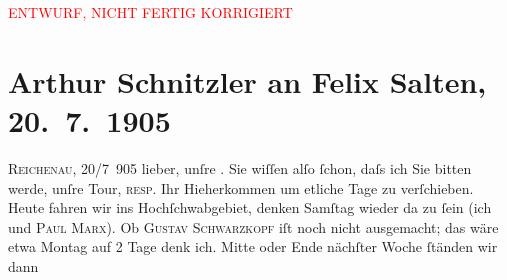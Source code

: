 
\begin{center}
            \textcolor{red}{ENTWURF, NICHT FERTIG KORRIGIERT}
                      \end{center}
            
         
         \renewcommand{\erwaehntePersonen}{Personen: Hermann Bahr, Paul Marx, Felix Salten, Paul Salten, Gustav Schwarzkopf}
         \renewcommand{\erwaehnteOrte}{Orte: Eisenerz, Hochschwab, Hotel Hochschwab, Kurhaus Rudolfsbad, Mariazell, Reichenau an der Rax, Weichselboden, Wien, Wildalpen}
         \renewcommand{\erwaehnteWerke}{Werke: Die Andere}
               \section[Arthur Schnitzler an Felix Salten, 20. 7. 1905]{ Arthur Schnitzler an Felix Salten, 20. 7. 1905}\nopagebreak{}\rehead{ }\begin{ledgroupsized}[t]{13cm}\normalsize\beginnumbering \toendnotes[C]{\smallbreak\pagebreak[2]} 
\toendnotes[C]{\smallbreak}\pstart
           \raggedleft{}{\pb}\textsc{Reichenau}, 20/7 905\pend
           \pstart
           lieber, unſre \label{K_L03000-1v}\label{K_L03000-1h}. Sie wiſſen alſo ſchon,
               daſs ich Sie bitten werde, unſre Tour, \textsc{resp.} Ihr
               Hieherkommen um etliche Tage zu verſchieben. Heute fahren wir ins Hochſchwabgebiet, denken Samſtag wieder da zu
               ſein (ich und \textsc{Paul Marx}). Ob \textsc{Gustav Schwarzkopf} iſt noch nicht ausgemacht; das wäre etwa Montag auf 2 Tage denk ich. Mitte {\pb}oder Ende nächſter Woche ſtänden wir dann

\end{ledgroupsized}
